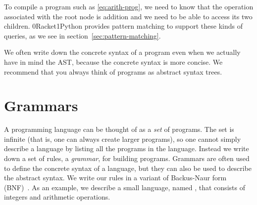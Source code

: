 \documentclass[7x10]{TimesAPriori_MIT}%
\def\racketEd{0}
\def\pythonEd{1}
\def\edition{0}
\newcommand{\racket}[1]{{\if\edition\racketEd{#1}\fi}}
\newcommand{\python}[1]{{\if\edition\pythonEd #1\fi}}
\numberwithin{theorem}{chapter}
\numberwithin{definition}{chapter}
\numberwithin{equation}{chapter}
\begin{document}
To compile a program such as \eqref{eq:arith-prog}, we need to know
that the operation associated with the root node is addition and we
need to be able to access its two
children. \racket{Racket}\python{Python} provides pattern matching to
support these kinds of queries, as we see in
section~\ref{sec:pattern-matching}.

We often write down the concrete syntax of a program even when we
actually have in mind the AST, because the concrete syntax is more
concise.  We recommend that you always think of programs as abstract
syntax trees.

\section{Grammars}
\label{sec:grammar}

A programming language can be thought of as a \emph{set} of programs.
The set is infinite (that is, one can always create larger programs),
so one cannot simply describe a language by listing all the
programs in the language. Instead we write down a set of rules, a
\emph{grammar}, for building programs. Grammars are often used to
define the concrete syntax of a language, but they can also be used to
describe the abstract syntax. We write our rules in a variant of
Backus-Naur form (BNF)~\citep{Backus:1960aa,Knuth:1964aa}.
 As an example,
we describe a small language, named \LangInt{}, that consists of
integers and arithmetic operations.  
\end{document}
